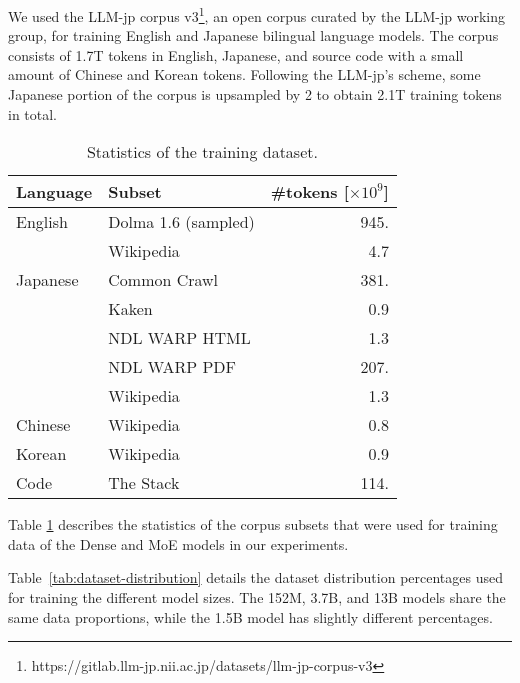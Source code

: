 We used the LLM-jp corpus v3\footnote{https://gitlab.llm-jp.nii.ac.jp/datasets/llm-jp-corpus-v3}, an open corpus curated by the LLM-jp working group, for training English and Japanese bilingual language models.
The corpus consists of 1.7T tokens in English, Japanese, and source code with a small amount of Chinese and Korean tokens.
Following the LLM-jp's scheme, some Japanese portion of the corpus is upsampled by 2 to obtain 2.1T training tokens in total.

\begin{table}[t]
\caption{Statistics of the training dataset.}
\label{tab:dataset}
\centering
\small
\begin{tabular}{ll|r}
\toprule
Language & Subset & \#tokens [$\times 10^9$] \\
\midrule
English  & Dolma 1.6 (sampled) \citep{soldaini-etal-2024-dolma} & 945.\hphantom{0} \\
         & Wikipedia                                            &   4.7 \\
\midrule
Japanese & Common Crawl \citep{llmjp2024llmjpcrossorganizationalprojectresearch} & 381.\hphantom{0} \\
         & Kaken                                                &   0.9 \\
         & NDL WARP HTML                                        &   1.3 \\
         & NDL WARP PDF                                         & 207.\hphantom{0} \\
         & Wikipedia                                            &   1.3 \\
\midrule
Chinese  & Wikipedia                                            & 0.8 \\
\midrule
Korean   & Wikipedia                                            & 0.9 \\
\midrule
Code     & The Stack \citep{kocetkov2023the}                    & 114.\hphantom{0} \\
\bottomrule
\end{tabular}
\end{table}

Table \ref{tab:dataset} describes the statistics of the corpus subsets that were used for training data of the Dense and MoE models in our experiments.

Table~\ref{tab:dataset-distribution} details the dataset distribution percentages used for training the different model sizes. The 152M, 3.7B, and 13B models share the same data proportions, while the 1.5B model has slightly different percentages. 


